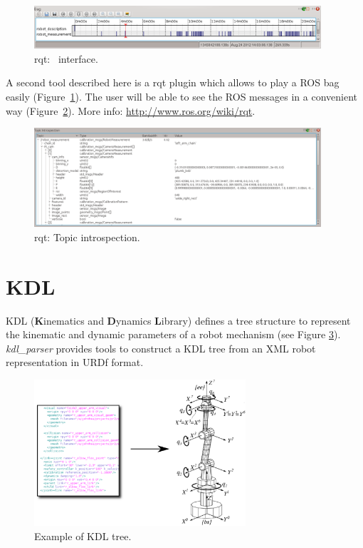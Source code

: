 \begin{figure}[!htbp]
 \centering
 \includegraphics[width=0.95\textwidth]{images/screenshots/rosbag01.png}
 \caption{rqt: \rosbag~interface.}
 \label{fig:rosbag01}
\end{figure}

A second tool described here is a rqt plugin which allows to play a ROS bag easily (Figure~\ref{fig:rosbag01}). The user will be able to see the ROS messages in a convenient way (Figure~\ref{fig:rosbag02}). More info: \url{http://www.ros.org/wiki/rqt}.

\begin{figure}[!htbp]
 \centering
 \includegraphics[width=0.95\textwidth]{images/screenshots/rosbag02.png}
 \caption{rqt: Topic introspection.}
 \label{fig:rosbag02}
\end{figure}


\section{KDL}
\label{sec:KDL}

KDL (\textbf{K}inematics and \textbf{D}ynamics \textbf{L}ibrary) defines a tree structure to represent the kinematic and dynamic parameters of a robot mechanism (see Figure \ref{fig:KDL}). \textit{kdl\_parser} provides tools to construct a KDL tree from an XML robot representation in URDf format.

\begin{figure}[!htbp]
 \centering
 \includegraphics[width=0.7\textwidth]{images/KDL02.png}
 \caption{Example of KDL tree.}
 \label{fig:KDL}
\end{figure}

